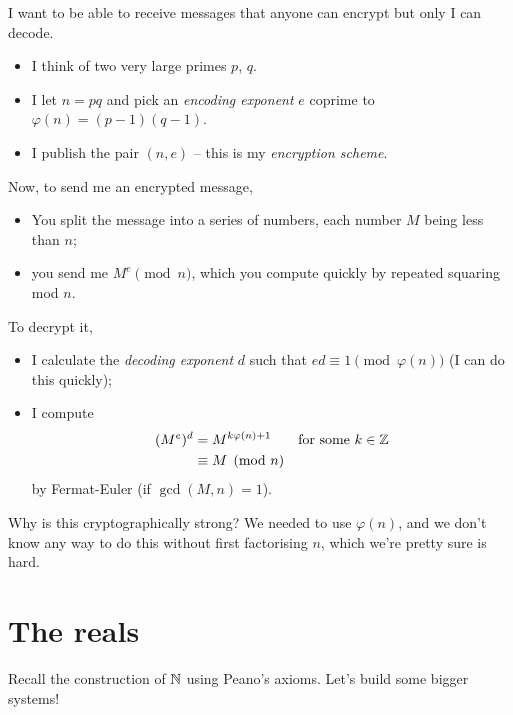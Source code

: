 \documentclass{../../template/note}
\begin{document}
    \begin{algorithm}[RSA]
        I want to be able to receive messages that anyone can encrypt but only I can decode.
        \begin{itemize}
            \item I think of two very large primes \(p\), \(q\).
            \item I let \(n = pq\) and pick an \emph{encoding exponent} \(e\) coprime to \(\varphi(n) = (p-1)(q-1)\).
            \item I publish the pair \((n, e)\) -- this is my \emph{encryption scheme}.
        \end{itemize}
        Now, to send me an encrypted message,
        \begin{itemize}
            \item You split the message into a series of numbers, each number \(M\) being less than \(n\);
            \item you send me \(M^e \pmod n\), which you compute quickly by repeated squaring mod \(n\).
        \end{itemize}
        To decrypt it,
        \begin{itemize}
            \item I calculate the \emph{decoding exponent} \(d\) such that \(ed \equiv 1 \pmod{\varphi(n)}\) (I can do this quickly);
            \item I compute
            \begin{align*}
                (M^e)^d &= M^{k \varphi(n) + 1} && \text{for some }k \in \mathbb Z\\
                &\equiv M \pmod n
            \end{align*}
            by Fermat-Euler (if \(\gcd(M, n) = 1\)).
        \end{itemize}
        Why is this cryptographically strong? We needed to use \(\varphi(n)\), and we don't know any way to do this without first factorising \(n\), which we're pretty sure is hard.    
    \end{algorithm}
    
    \section{The reals}
    
    Recall the construction of \(\mathbb N\) using Peano's axioms. Let's build some bigger systems!
\end{document}
